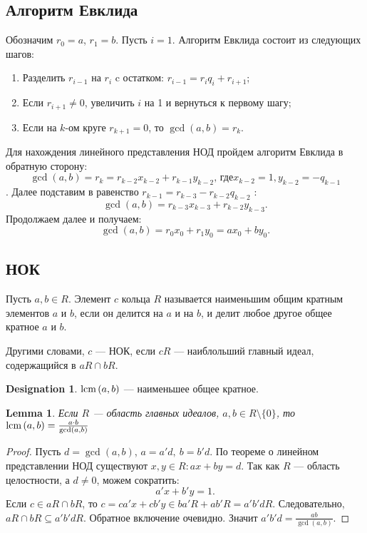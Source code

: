 \documentclass[11pt]{book}
\newcommand{\lcm}{{\mathop{\text{\rm lcm}}\,}}
\theoremstyle{definition}
\theoremstyle{plain}
\theoremstyle{plain}
\newtheorem{lm}{Lemma}
\theoremstyle{definition}
\newtheorem*{name}{Designation}
\theoremstyle{remark}
\begin{document}
\subsection{Алгоритм Евклида}
Обозначим $ r_0 = a$, $ r_1 = b$. Пусть $ i = 1$. Алгоритм Евклида состоит из следующих шагов:
\begin{enumerate}[noitemsep]
    \item Разделить $ r_{i-1} $ на $ r_i$ c остатком:  $ r_{i-1} = r_i q_i + r_{i+1}$;
    \item Если $ r_{i+1} \ne  0$, увеличить $ i $ на 1 и вернуться к первому шагу;
    \item Если на $ k$-ом  круге $ r_{k+1} = 0$, то $ \gcd(a, b) = r_k$.
\end{enumerate}
Для нахождения линейного представления НОД пройдем алгоритм Евклида в обратную сторону: $$ \gcd(a, b) = r_k = r_{k-2}x_{k-2} + r_{k-1}y_{k-2} \text{, где}  x_{k-2} = 1, y_{k-2} = - q_{k-1}$$. Далее подставим в равенство  $ r_{k-1} = r_{k-3}-r_{k-2}q_{k-2}$ :
\[
    \gcd(a, b) = r_{k-3}x_{k-3}+ r_{k-2}y_{k-3}
.\]
Продолжаем далее и получаем:
\[
    \gcd(a, b) = r_0x_0 + r_1y_0 = ax_0 + by_0
.\]
\subsection{НОК}
\begin{defn}
    Пусть $ a, b \in R$. Элемент $ c$ кольца  $ R$ называется {\sf наименьшим общим кратным} элементов  $ a$ и  $ b$, если он делится на $ a$ и на $ b$, и делит любое другое общее кратное $ a$ и  $ b$.

    Другими словами, $ c $ --- НОК, если  $ cR$ --- наиблольший главный идеал, содержащийся в  $ aR \cap bR$.
    \begin{name}
	$ \lcm(a, b)$ --- наименьшее общее кратное.
    \end{name}
\end{defn}
\begin{lm}
    Если $ R$ --- область главных идеалов,  $ a, b \in R \setminus \{0\}$, то
    $ \lcm(a, b) = \frac{a \cdot b}{\gcd(a, b)}$
\end{lm}
\begin{proof}
    Пусть $ d = \gcd(a, b)$,  $ a = a'd, ~ b= b'd$. По теореме о линейном представлении НОД существуют  $ x, y \in R: ax + by = d$. Так как $ R$ --- область целостности, а $ d \ne  0$, можем сократить:
    \[
	a'x + b'y = 1
    .\]
    Если $ c \in aR \cap  bR$, то $ c = ca'x + c b'y \in ba'R + ab'R = a'b'dR$. Следовательно, $ aR \cap bR \subseteq a'b'dR$. Обратное включение очевидно. Значит $ a'b'd = \frac{ab}{\gcd(a, b)}$.
\end{proof}
\end{document}
